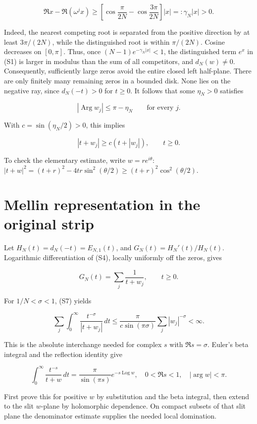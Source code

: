 \[
\Re x-\Re(\omega^j x)
\ge \left[\cos\frac{\pi}{2N}-\cos\frac{3\pi}{2N}\right]|x|
=:\gamma_N|x|>0.
\tag{S5}
\]

Indeed, the nearest competing root is separated from the positive
direction by at least \(3\pi/(2N)\), while the distinguished root is
within \(\pi/(2N)\). Cosine decreases on \([0,\pi]\). Thus, once
\((N-1)e^{-\gamma_N|x|}<1\), the distinguished term \(e^x\) in (S1) is
larger in modulus than the sum of all competitors, and \(d_N(w)\ne0\).
Consequently, sufficiently large zeros avoid the entire closed left
half-plane. There are only finitely many remaining zeros in a bounded
disk. None lies on the negative ray, since \(d_N(-t)>0\) for \(t\ge0\).
It follows that some \(\eta_N>0\) satisfies

\[
|\operatorname{Arg}w_j|\le\pi-\eta_N\qquad\text{for every }j.
\tag{S6}
\]

With \(c=\sin(\eta_N/2)>0\), this implies

\[
|t+w_j|\ge c(t+|w_j|),\qquad t\ge0.
\tag{S7}
\]

To check the elementary estimate, write \(w=re^{i\theta}\):
\(|t+w|^2=(t+r)^2-4tr\sin^2(\theta/2)\ge(t+r)^2\cos^2(\theta/2)\).

\hypertarget{mellin-representation-in-the-original-strip}{%
\section{Mellin representation in the original
strip}\label{mellin-representation-in-the-original-strip}}

Let \(H_N(t)=d_N(-t)=E_{N,1}(t)\), and \(G_N(t)=H_N'(t)/H_N(t)\).
Logarithmic differentiation of (S4), locally uniformly off the zeros,
gives

\[
G_N(t)=\sum_j\frac1{t+w_j},\qquad t\ge0.
\tag{S8}
\]

For \(1/N<\sigma<1\), (S7) yields

\[
\sum_j\int_0^\infty\frac{t^{-\sigma}}{|t+w_j|}\,dt
\le\frac{\pi}{c\sin(\pi\sigma)}\sum_j|w_j|^{-\sigma}<\infty.
\tag{S9}
\]

This is the absolute interchange needed for complex \(s\) with
\(\Re s=\sigma\). Euler's beta integral and the reflection identity give

\[
\int_0^\infty\frac{t^{-s}}{t+w}\,dt
=\frac{\pi}{\sin(\pi s)}e^{-s\operatorname{Log}w},
\quad 0<\Re s<1,\quad |\arg w|<\pi.
\tag{S10}
\]

First prove this for positive \(w\) by substitution and the beta
integral, then extend to the slit \(w\)-plane by holomorphic dependence.
On compact subsets of that slit plane the denominator estimate supplies
the needed local domination.

